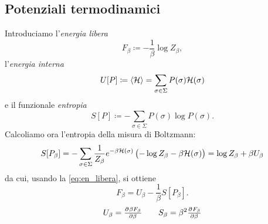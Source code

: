 \subsection{Potenziali termodinamici}
Introduciamo l'\emph{energia libera}
\begin{equation}\label{eq:en_libera}
    F_\beta \coloneqq -\frac{1}{\beta} \log{Z_\beta},
\end{equation}
l'\emph{energia interna}
\begin{equation}
    U[P] \coloneqq \langle\mathcal{H}\rangle = \sum_{\sigma\in\Sigma} P(\sigma)\mathcal{H}(\sigma)
\end{equation}
e il funzionale \emph{entropia}
\begin{equation}
    S[P] \coloneqq -\sum_{\sigma\in\Sigma} P(\sigma) \log{P(\sigma)}.
\end{equation}
Calcoliamo ora l'entropia della misura di Boltzmann:
\[ S[P_\beta] = - \sum_{\sigma\in\Sigma} \frac{1}{Z_\beta}e^{-\beta\mathcal{H}(\sigma)} \left( -\log{Z_\beta}  - \beta\mathcal{H}(\sigma) \right) = \log{Z_\beta} + \beta U_\beta \]
da cui, usando la \eqref{eq:en_libera}, si ottiene
\begin{equation} \label{eqn:gibbs-boltzmann}
    F_\beta = U_\beta - \frac{1}{\beta} S[P_\beta].
\end{equation}
\begin{equation}
    U_\beta = \pd{\beta F_\beta}{\beta} \qquad S_\beta = \beta^2 \pd{F_\beta}{\beta}
\end{equation}

